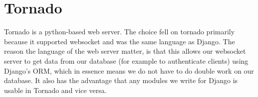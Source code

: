 \section{Tornado}
Tornado\cite{tornadoweb11} is a python-based web server. The choice fell on tornado primarily because it supported websocket and was the same language as Django. The reason the language of the web server matter, is that this allows our websocket server to get data from our database (for example to authenticate clients) using Django's ORM, which in essence means we do not have to do double work on our database. It also has the advantage that any modules we write for Django is usable in Tornado and vice versa.